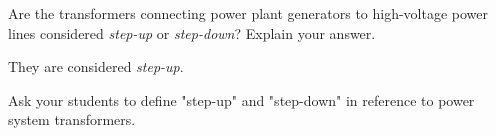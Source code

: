 

Are the transformers connecting power plant generators to high-voltage power lines considered {\it step-up} or {\it step-down}?  Explain your answer.







They are considered {\it step-up}.







Ask your students to define "step-up" and "step-down" in reference to power system transformers.




